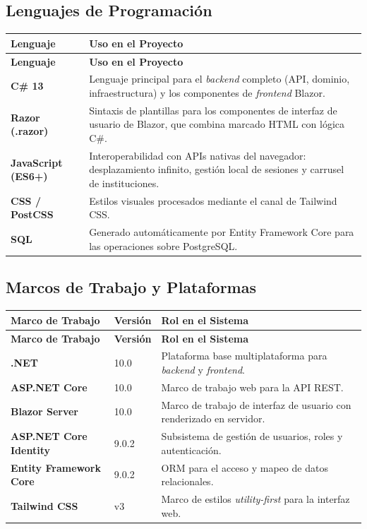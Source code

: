 \subsection{Lenguajes de Programación}
\begin{longtable}{|p{3.5cm}|p{11cm}|}
\hline
\textbf{Lenguaje} & \textbf{Uso en el Proyecto} \\
\hline
\endfirsthead
\hline
\textbf{Lenguaje} & \textbf{Uso en el Proyecto} \\
\hline
\endhead
\textbf{C\# 13}~\cite{csharp_13_docs} & Lenguaje principal para el \textit{backend} 
completo (API, dominio, infraestructura) y los componentes de \textit{frontend} Blazor. \\
\hline
\textbf{Razor (.razor)} & Sintaxis de plantillas para los componentes de interfaz de usuario de Blazor, 
que combina marcado HTML con lógica C\#. \\
\hline
\textbf{JavaScript (ES6+)} & Interoperabilidad con APIs nativas del navegador: desplazamiento infinito, 
gestión local de sesiones y carrusel de instituciones. \\
\hline
\textbf{CSS / PostCSS} & Estilos visuales procesados mediante el canal de Tailwind CSS. \\
\hline
\textbf{SQL} & Generado automáticamente por Entity Framework Core para las operaciones sobre PostgreSQL. \\
\hline
\end{longtable}

\subsection{Marcos de Trabajo y Plataformas}
\begin{longtable}{|p{4.5cm}|p{1.5cm}|p{8.5cm}|}
\hline
\textbf{Marco de Trabajo} & \textbf{Versión} & \textbf{Rol en el Sistema} \\
\hline
\endfirsthead
\hline
\textbf{Marco de Trabajo} & \textbf{Versión} & \textbf{Rol en el Sistema} \\
\hline
\endhead
\textbf{.NET}~\cite{aspnet_core_docs} & 10.0 & Plataforma base multiplataforma para \textit{backend} 
y \textit{frontend}. \\
\hline
\textbf{ASP.NET Core} & 10.0 & Marco de trabajo web para la API REST. \\
\hline
\textbf{Blazor Server}~\cite{blazor_docs} & 10.0 & Marco de trabajo de interfaz de usuario con 
renderizado en servidor. \\
\hline
\textbf{ASP.NET Core Identity}~\cite{aspnet_identity} & 9.0.2 & Subsistema de gestión de usuarios, 
roles y autenticación. \\
\hline
\textbf{Entity Framework Core}~\cite{ef_core_docs} & 9.0.2 & ORM para el acceso y mapeo de datos relacionales. \\
\hline
\textbf{Tailwind CSS}~\cite{tailwindcss_docs} & v3 & Marco de estilos \textit{utility-first} para la interfaz web. \\
\hline
\end{longtable}

